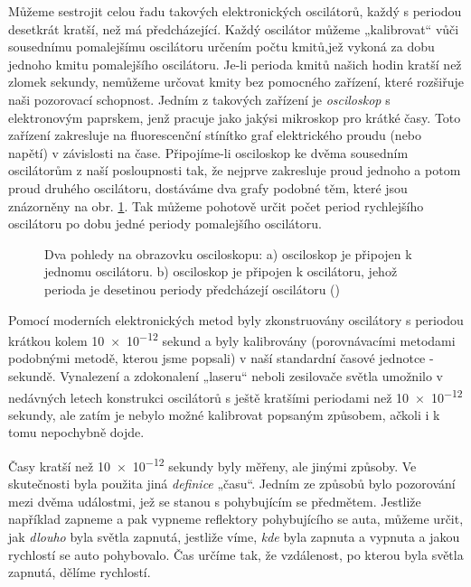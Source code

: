     Můžeme sestrojit celou řadu takových elektronických oscilátorů, každý s periodou desetkrát
    kratší, než má předcházející. Každý oscilátor můžeme „kalibrovat“ vůči sousednímu pomalejšímu
    oscilátoru určením počtu kmitů,jež vykoná za dobu jednoho kmitu pomalejšího oscilátoru. Je-li
    perioda kmitů našich hodin kratší než zlomek sekundy, nemůžeme určovat kmity bez pomocného
    zařízení, které rozšiřuje naši pozorovací schopnost. Jedním z takových zařízení je
    \emph{osciloskop} s elektronovým paprskem, jenž pracuje jako jakýsi mikroskop pro krátké časy.
    Toto zařízení zakresluje na fluorescenční stínítko graf elektrického proudu (nebo napětí) v
    závislosti na čase. Připojíme-li osciloskop ke dvěma sousedním oscilátorům z naší posloupnosti
    tak, že nejprve zakresluje proud jednoho a potom proud druhého oscilátoru, dostáváme dva grafy
    podobné těm, které jsou znázorněny na obr. \ref{fyz:fig065}. Tak můžeme pohotově určit počet
    period rychlejšího oscilátoru po dobu jedné periody pomalejšího oscilátoru. 
    
    \begin{figure}[ht!]  %
      \centering
       \hspace{2em}
      \caption{Dva pohledy na obrazovku osciloskopu: a) osciloskop je připojen k jednomu oscilátoru.
               b) osciloskop je připojen k oscilátoru, jehož perioda je desetinou periody 
               předcházejí oscilátoru (\cite[s.~66]{Feynman01})}
      \label{fyz:fig065}
    \end{figure}
    
    Pomocí moderních elektronických metod byly zkonstruovány oscilátory s periodou krátkou kolem 
    \num{10e-12} sekund a byly kalibrovány (porovnávacími metodami podobnými metodě, kterou
    jsme popsali) v naší standardní časové jednotce - sekundě. Vynalezení a zdokonalení „laseru“ 
    neboli zesilovače světla umožnilo v nedávných letech konstrukci oscilátorů s ještě kratšími 
    periodami než \num{10e-12} sekundy, ale zatím je nebylo možné kalibrovat popsaným způsobem, 
    ačkoli i k tomu nepochybně dojde.
    
    Časy kratší než \num{10e-12} sekundy byly měřeny, ale jinými způsoby. Ve skutečnosti byla 
    použita jiná \emph{definice} „času“. Jedním ze způsobů bylo pozorování mezi dvěma událostmi, 
    jež se stanou s pohybujícím se předmětem. Jestliže například zapneme a pak vypneme reflektory 
    pohybujícího se auta, můžeme určit, jak \emph{dlouho} byla světla zapnutá, jestliže víme, 
    \emph{kde} byla zapnuta a vypnuta a jakou rychlostí se auto pohybovalo. Čas určíme tak, že 
    vzdálenost, po kterou byla světla zapnutá, dělíme rychlostí.
    
